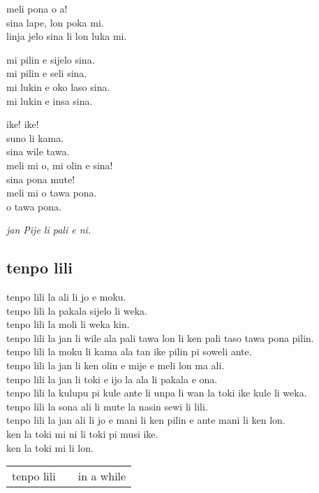 meli pona o a! \\
sina lape, lon poka mi. \\
linja jelo sina li lon luka mi.

mi pilin e sijelo sina. \\
mi pilin e seli sina. \\
mi lukin e oko laso sina. \\
mi lukin e insa sina.

ike! ike! \\
suno li kama. \\
sina wile tawa. \\
meli mi o, mi olin e sina! \\
sina pona mute! \\
meli mi o tawa pona. \\
o tawa pona.

\textit{jan Pije li pali e ni. \cite{www:Pije:01}}
%
\newpage
\subsection{tenpo lili}

tenpo lili la ali li jo e moku.     \\
tenpo lili la pakala sijelo li weka.     \\
tenpo lili la moli li weka kin.     \\
tenpo lili la jan li wile ala pali tawa lon li ken pali taso tawa pona
pilin.     \\
tenpo lili la moku li kama ala tan ike pilin pi soweli ante.     \\
tenpo lili la jan li ken olin e mije e meli lon ma ali.     \\
tenpo lili la jan li toki e ijo la ala li pakala e ona.     \\
tenpo lili la kulupu pi kule ante li unpa li wan la toki ike kule li
weka. \\
tenpo lili la sona ali li mute la nasin sewi li lili.     \\
tenpo lili la jan ali li jo e mani li ken pilin e ante mani li ken lon.     \\
ken la toki mi ni li toki pi musi ike.     \\
ken la toki mi li lon.

\begin{supertabular}{p{5,5cm}|ll}
    tenpo lili &  & in a while \\
\end{supertabular}

